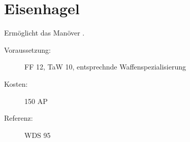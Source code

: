 \section{Eisenhagel}
\label{sf.eisenhagel}
Ermöglicht das Manöver .
\begin{description}
    \item[Voraussetzung:]
        FF 12, TaW  10, entsprechnde Waffenspezialisierung
    \item [Kosten:]
        150 AP
    \item [Referenz:]
        WDS 95
\end{description}
